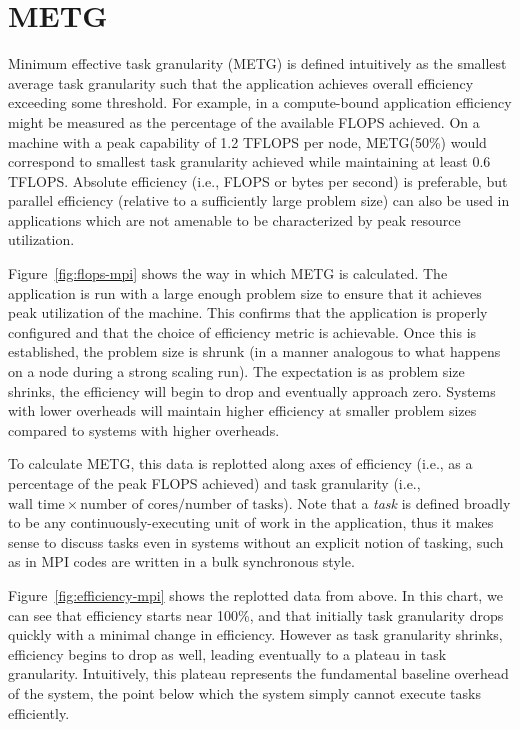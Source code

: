 \section{METG}
\label{sec:metg}




Minimum effective task granularity (METG) is defined intuitively as
the smallest average task granularity such that the application
achieves overall efficiency exceeding some threshold. For example, in
a compute-bound application efficiency might be measured as the
percentage of the available FLOPS achieved. On a machine with a peak
capability of 1.2 TFLOPS per node, METG(50\%) would correspond to
smallest task granularity achieved while maintaining at least 0.6
TFLOPS. Absolute efficiency (i.e., FLOPS or bytes per second) is
preferable, but parallel efficiency (relative to a sufficiently large
problem size) can also be used in applications which are not amenable
to be characterized by peak resource utilization.

Figure~\ref{fig:flops-mpi} shows the way in which METG is
calculated. The application is run with a large enough problem size to
ensure that it achieves peak utilization of the machine. This confirms
that the application is properly configured and that the choice of
efficiency metric is achievable. Once this is established, the problem
size is shrunk (in a manner analogous to what happens on a node during
a strong scaling run). The expectation is as problem size shrinks, the
efficiency will begin to drop and eventually approach zero. Systems
with lower overheads will maintain higher efficiency at smaller
problem sizes compared to systems with higher overheads.

To calculate METG, this data is replotted along axes of efficiency
(i.e., as a percentage of the peak FLOPS achieved) and task
granularity (i.e., $\text{wall time} \times \text{number of
  cores}/\text{number of tasks}$). Note that a \emph{task} is defined
broadly to be any continuously-executing unit of work in the
application, thus it makes sense to discuss tasks even in systems
without an explicit notion of tasking, such as in MPI codes are written in
a bulk synchronous style.

Figure~\ref{fig:efficiency-mpi}
shows the replotted data from above. In this chart, we can see that
efficiency starts near 100\%, and that initially task granularity
drops quickly with a minimal change in efficiency. However as task
granularity shrinks, efficiency begins to drop as well, leading
eventually to a plateau in task granularity. Intuitively, this plateau
represents the fundamental baseline overhead of the system, the point
below which the system simply cannot execute tasks efficiently.

